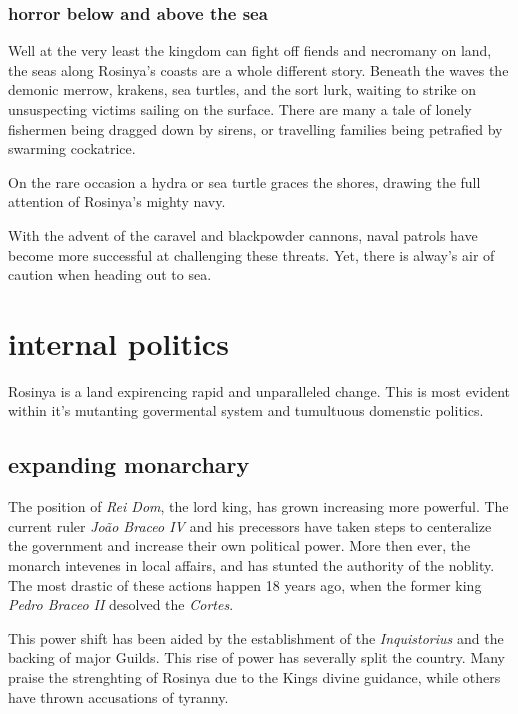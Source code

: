 \documentclass[../main.tex]{subfiles}
\begin{document}
\subsubsection{horror below and above the sea}
Well at the very least the kingdom can fight off fiends and necromany on land, the 
seas along Rosinya's coasts are a whole different story. Beneath the waves the 
demonic merrow, krakens, sea turtles, and the sort lurk, waiting to strike on unsuspecting 
victims sailing on the surface. There are many a tale of lonely fishermen being
dragged down by sirens, or travelling families being petrafied by swarming cockatrice.

On the rare occasion a hydra or sea turtle graces the shores, drawing the full
attention of Rosinya's mighty navy. 

With the advent of the caravel and blackpowder cannons, naval patrols have become more 
successful at challenging these threats. Yet, there is alway's air of caution 
when heading out to sea.


\section{internal politics}
Rosinya is a land expirencing rapid and unparalleled change. This is most evident within
it's mutanting govermental system and tumultuous domenstic politics.

\subsection{expanding monarchary}
The position of \emph{Rei Dom}, the lord king, has grown increasing more powerful. 
The current ruler \emph{João Braceo IV} and his precessors have taken steps to
centeralize the government and increase their own political power. More then ever, 
the monarch intevenes in local affairs, and has stunted the authority of the noblity.
The most drastic of these actions happen 18 years ago, when the former king \emph{Pedro Braceo II}
desolved the \emph{Cortes}.

This power shift has been aided by the establishment of the \emph{Inquistorius} and the 
backing of major Guilds. This rise of power has severally split the country. Many praise the 
strenghting of Rosinya due to the Kings divine guidance, while others have thrown 
accusations of tyranny.
\end{document}
